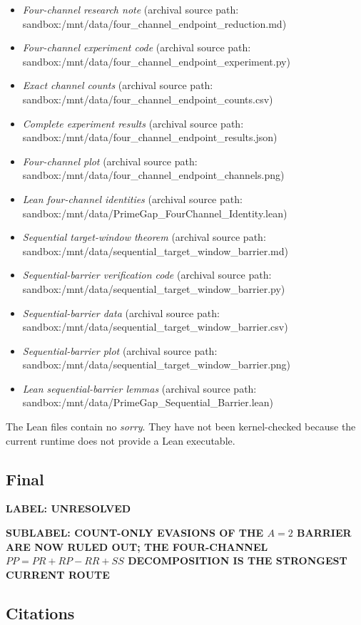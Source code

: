 \begin{itemize}
\item \emph{Four-channel research note} (archival source path: sandbox:/mnt/data/four_channel_endpoint_reduction.md)
\item \emph{Four-channel experiment code} (archival source path: sandbox:/mnt/data/four_channel_endpoint_experiment.py)
\item \emph{Exact channel counts} (archival source path: sandbox:/mnt/data/four_channel_endpoint_counts.csv)
\item \emph{Complete experiment results} (archival source path: sandbox:/mnt/data/four_channel_endpoint_results.json)
\item \emph{Four-channel plot} (archival source path: sandbox:/mnt/data/four_channel_endpoint_channels.png)
\item \emph{Lean four-channel identities} (archival source path: sandbox:/mnt/data/PrimeGap_FourChannel_Identity.lean)
\item \emph{Sequential target-window theorem} (archival source path: sandbox:/mnt/data/sequential_target_window_barrier.md)
\item \emph{Sequential-barrier verification code} (archival source path: sandbox:/mnt/data/sequential_target_window_barrier.py)
\item \emph{Sequential-barrier data} (archival source path: sandbox:/mnt/data/sequential_target_window_barrier.csv)
\item \emph{Sequential-barrier plot} (archival source path: sandbox:/mnt/data/sequential_target_window_barrier.png)
\item \emph{Lean sequential-barrier lemmas} (archival source path: sandbox:/mnt/data/PrimeGap_Sequential_Barrier.lean)
\end{itemize}

The Lean files contain no \emph{sorry}. They have not been kernel-checked because the current runtime does not provide a Lean executable.

\subsection*{Final}

\textbf{LABEL: UNRESOLVED}

\textbf{SUBLABEL: COUNT-ONLY EVASIONS OF THE \(A=2\) BARRIER ARE NOW RULED OUT; THE FOUR-CHANNEL \(PP=PR+RP-RR+SS\) DECOMPOSITION IS THE STRONGEST CURRENT ROUTE}

\subsection*{Citations}

